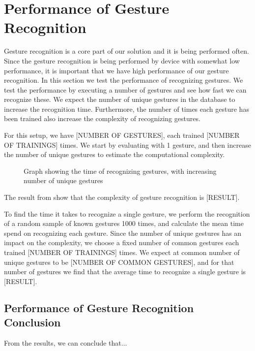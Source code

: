 \section{Performance of Gesture Recognition}\label{sec:gestureperformance}
Gesture recognition is a core part of our solution and it is being performed often. 
Since the gesture recognition is being performed by device with somewhat low performance,
it is important that we have high performance of our gesture recognition. 
In this section we test the performance of recognizing gestures. 
We test the performance by executing a number of gestures and see how fast we can recognize these.  
We expect the number of unique gestures in the database to increase the recognition time. 
Furthermore, the number of times each gesture has been trained also increase the complexity of recognizing gestures. %

For this setup, we have [NUMBER OF GESTURES], each trained [NUMBER OF TRAININGS] times. 
We start by evaluating with \num{1} gesture, and then increase the number of unique gestures to estimate the computational complexity.

\begin{figure}[!htb]
    \centering
    \caption{Graph showing the time of recognizing gestures, with increasing number of unique gestures}
    \label{fig:performancegraph}
\end{figure}

The result from  show that the complexity of gesture recognition is [RESULT]. 

To find the time it takes to recognize a single gesture, 
we perform the recognition of a random sample of known gestures \num{1000} times, 
and calculate the mean time spend on recognizing each gesture. 
Since the number of unique gestures has an impact on the complexity, 
we choose a fixed number of common gestures each trained [NUMBER OF TRAININGS] times. 
We expect at common number of unique gestures to be [NUMBER OF COMMON GESTURES], 
and for that number of gestures we find that the average time to recognize a single gesture is [RESULT]. 

\subsection{Performance of Gesture Recognition Conclusion}
From the results, we can conclude that... 
